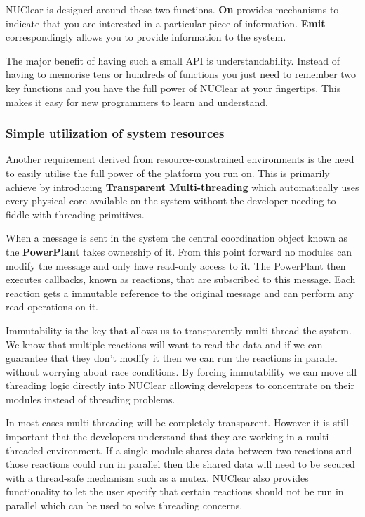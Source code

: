 \documentclass[english,12pt]{scrartcl}
\begin{document}
				NUClear is designed around these two functions. \textbf{On} provides mechanisms to indicate that you are interested in a particular piece of information.
				\textbf{Emit} correspondingly allows you to provide information to the system.

				The major benefit of having such a small API is understandability.
				Instead of having to memorise tens or hundreds of functions you just need to remember two key functions and you have the full power of NUClear at your fingertips.
				This makes it easy for new programmers to learn and understand.

			\subsubsection{Simple utilization of system resources}
				Another requirement derived from resource-constrained environments is the need to easily utilise the full power of the platform you run on.
				This is primarily achieve by introducing \textbf{Transparent Multi-threading} which automatically uses every physical core available on the system without the developer needing to fiddle with threading primitives.

				When a message is sent in the system the central coordination object known as the \textbf{PowerPlant} takes ownership of it.
				From this point forward no modules can modify the message and only have read-only access to it.
				The PowerPlant then executes callbacks, known as reactions, that are subscribed to this message.
				Each reaction gets a immutable reference to the original message and can perform any read operations on it.

				Immutability is the key that allows us to transparently multi-thread the system.
				We know that multiple reactions will want to read the data and if we can guarantee that they don't modify it then we can
				run the reactions in parallel without worrying about race conditions.
				By forcing immutability we can move all threading logic directly into NUClear allowing developers to concentrate on their modules instead of threading problems.

				In most cases multi-threading will be completely transparent.
				However it is still important that the developers understand that they are working in a multi-threaded environment.
				If a single module shares data between two reactions and those reactions could run in parallel then the shared data will
				need to be secured with a thread-safe mechanism such as a mutex.
				NUClear also provides functionality to let the user specify that certain reactions should not be run in parallel which can be used to solve threading concerns.
\end{document}
